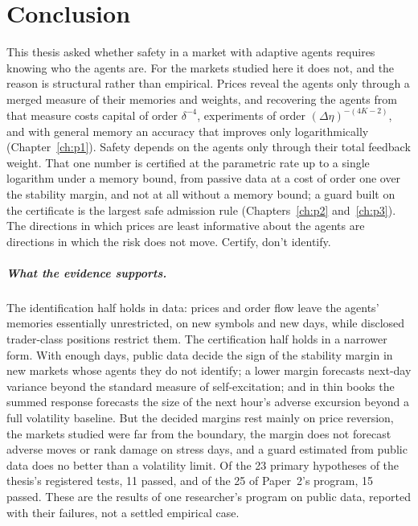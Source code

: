 \chapter{Conclusion}\label{ch:conclusion}

This thesis asked whether safety in a market with adaptive agents requires knowing who the agents are. For the markets studied here it does not, and the reason is structural rather than empirical. Prices reveal the agents only through a merged measure of their memories and weights, and recovering the agents from that measure costs capital of order $\delta^{-4}$, experiments of order $(\Delta\eta)^{-(4K-2)}$, and with general memory an accuracy that improves only logarithmically (Chapter~\ref{ch:p1}). Safety depends on the agents only through their total feedback weight. That one number is certified at the parametric rate up to a single logarithm under a memory bound, from passive data at a cost of order one over the stability margin, and not at all without a memory bound; a guard built on the certificate is the largest safe admission rule (Chapters~\ref{ch:p2} and~\ref{ch:p3}). The directions in which prices are least informative about the agents are directions in which the risk does not move. Certify, don't identify.

\paragraph{What the evidence supports.} The identification half holds in data: prices and order flow leave the agents' memories essentially unrestricted, on new symbols and new days, while disclosed trader-class positions restrict them. The certification half holds in a narrower form. With enough days, public data decide the sign of the stability margin in new markets whose agents they do not identify; a lower margin forecasts next-day variance beyond the standard measure of self-excitation; and in thin books the summed response forecasts the size of the next hour's adverse excursion beyond a full volatility baseline. But the decided margins rest mainly on price reversion, the markets studied were far from the boundary, the margin does not forecast adverse moves or rank damage on stress days, and a guard estimated from public data does no better than a volatility limit. Of the 23 primary hypotheses of the thesis's registered tests, 11 passed, and of the 25 of Paper~2's program, 15 passed. These are the results of one researcher's program on public data, reported with their failures, not a settled empirical case.

